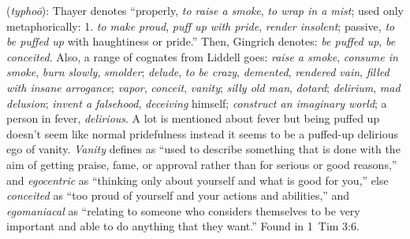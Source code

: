 \item[Egomaniacal,]

(\textit{typhoō}):
Thayer denotes ``properly, \emph{to raise a smoke}, \emph{to wrap in a mist}; used only metaphorically:  1. \emph{to make proud}, \emph{puff up with pride}, \emph{render insolent}; passive, \emph{to be puffed up} with haughtiness or pride.'' Then, Gingrich denotes: \emph{be puffed up}, \emph{be conceited}. Also, a range of cognates from Liddell goes:  \emph{raise a smoke}, \emph{consume in smoke}, \emph{burn slowly}, \emph{smolder};  \emph{delude}, \emph{to be crazy}, \emph{demented}, \emph{rendered vain}, \emph{filled with insane arrogance};  \emph{vapor}, \emph{conceit}, \emph{vanity};  \emph{silly old man}, \emph{dotard};  \emph{delirium}, \emph{mad delusion};  \emph{invent a falsehood}, \emph{deceiving} himself;  \emph{construct an imaginary world};  a person in fever, \emph{delirious}. A lot is mentioned about fever but being puffed up doesn't seem like normal pridefulness instead it seems to be a puffed-up delirious ego of vanity. \emph{Vanity} defines as ``used to describe something that is done with the aim of getting praise, fame, or approval rather than for serious or good reasons,'' and \emph{egocentric} as ``thinking only about yourself and what is good for you,'' else \emph{conceited} as ``too proud of yourself and your actions and abilities,'' and \emph{egomaniacal} as ``relating to someone who considers themselves to be very important and able to do anything that they want.''
Found in 1~Tim 3:6.
